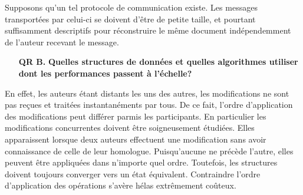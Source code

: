 \begin{itemize}
  Supposons qu'un tel protocole de communication existe. Les messages
  transportées par celui-ci se doivent d'être de petite taille, et pourtant
  suffisamment descriptifs pour réconstruire le même document indépendemment de
  l'auteur recevant le message.
  \begin{itemize}
  \item [\textbf{QR B.}] \textbf{Quelles structures de données et quelles
      algorithmes utiliser dont les performances passent à l'échelle?}
  \end{itemize}
  En effet, les auteurs étant distants les uns des autres, les modifications ne
  sont pas reçues et traitées instantanéments par tous. De ce fait, l'ordre
  d'application des modifications peut différer parmis les participants. En
  particulier les modifications concurrentes doivent être soigneusement
  étudiées. Elles apparaissent lorsque deux auteurs effectuent une modification
  sans avoir connaissance de celle de leur homologue. Puisqu'aucune ne précède
  l'autre, elles peuvent être appliquées dans n'importe quel ordre. Toutefois,
  les structures doivent toujours converger vers un état équivalent. Contraindre
  l'ordre d'application des opérations s'avère hélas extrêmement coûteux.

\end{itemize}

